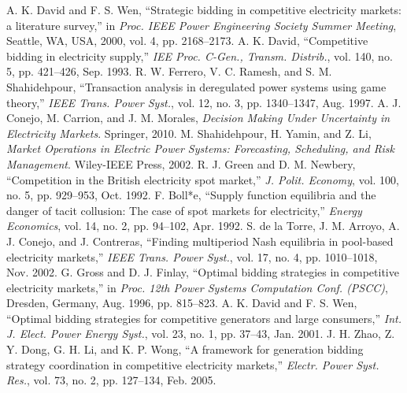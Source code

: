 \documentclass[conference]{IEEEtran}
\begin{document}
\begin{thebibliography}{99}


 A. K. David and F. S. Wen, “Strategic bidding in competitive electricity markets: a literature survey,” in \textit{Proc. IEEE Power Engineering Society Summer Meeting}, Seattle, WA, USA, 2000, vol. 4, pp. 2168–2173.
 A. K. David, “Competitive bidding in electricity supply,” \textit{IEE Proc. C-Gen., Transm. Distrib.}, vol. 140, no. 5, pp. 421–426, Sep. 1993.
 R. W. Ferrero, V. C. Ramesh, and S. M. Shahidehpour, “Transaction analysis in deregulated power systems using game theory,” \textit{IEEE Trans. Power Syst.}, vol. 12, no. 3, pp. 1340–1347, Aug. 1997.
 A. J. Conejo, M. Carrion, and J. M. Morales, \textit{Decision Making Under Uncertainty in Electricity Markets}. Springer, 2010. %
 M. Shahidehpour, H. Yamin, and Z. Li, \textit{Market Operations in Electric Power Systems: Forecasting, Scheduling, and Risk Management}. Wiley-IEEE Press, 2002. 
 R. J. Green and D. M. Newbery, “Competition in the British electricity spot market,” \textit{J. Polit. Economy}, vol. 100, no. 5, pp. 929–953, Oct. 1992.
 F. Boll*e, “Supply function equilibria and the danger of tacit collusion: The case of spot markets for electricity,” \textit{Energy Economics}, vol. 14, no. 2, pp. 94–102, Apr. 1992. %
 S. de la Torre, J. M. Arroyo, A. J. Conejo, and J. Contreras, “Finding multiperiod Nash equilibria in pool-based electricity markets,” \textit{IEEE Trans. Power Syst.}, vol. 17, no. 4, pp. 1010–1018, Nov. 2002. 
 G. Gross and D. J. Finlay, “Optimal bidding strategies in competitive electricity markets,” in \textit{Proc. 12th Power Systems Computation Conf. (PSCC)}, Dresden, Germany, Aug. 1996, pp. 815–823.
 A. K. David and F. S. Wen, “Optimal bidding strategies for competitive generators and large consumers,” \textit{Int. J. Elect. Power Energy Syst.}, vol. 23, no. 1, pp. 37–43, Jan. 2001.
 J. H. Zhao, Z. Y. Dong, G. H. Li, and K. P. Wong, “A framework for generation bidding strategy coordination in competitive electricity markets,” \textit{Electr. Power Syst. Res.}, vol. 73, no. 2, pp. 127–134, Feb. 2005. 

\end{thebibliography}
\end{document}
